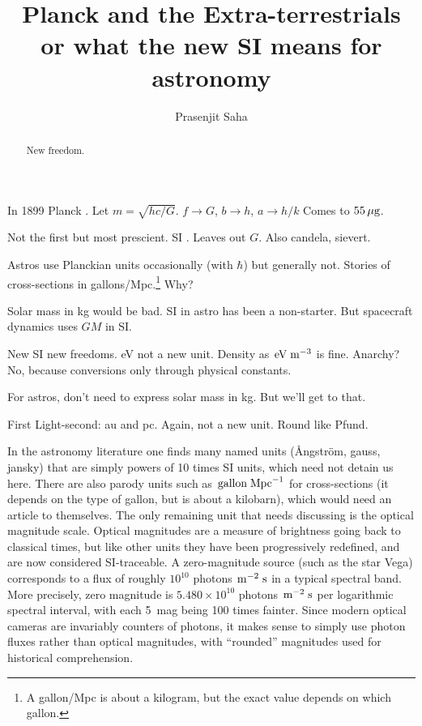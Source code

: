 \documentclass[aps,prb,12pt]{revtex4-1}
\def\unit#1{\;{\rm#1}}
\begin{document}
\title{Planck and the Extra-terrestrials\\
       or what the new SI means for astronomy}

\author{Prasenjit Saha} 

\begin{abstract}
New freedom.
\end{abstract}

\maketitle

In 1899 Planck \cite{Planck1899}.
Let $m=\sqrt{hc/G}$.
$f \rightarrow G$, $b\rightarrow h$, $a\rightarrow h/k$
Comes to $55\rm\,\mu g$.

Not the first \cite{Tomilin1999} but most prescient.  SI
\cite{Jeckelmann_2018}.  Leaves out $G$.  Also candela, sievert.

Astros use Planckian units occasionally (with $\hbar$) but generally
not.  Stories of cross-sections in gallons/Mpc.\footnote{A gallon/Mpc
  is about a kilogram, but the exact value depends on which gallon.}
Why?

Solar mass in kg would be bad.  SI in astro has been a non-starter.
But spacecraft dynamics uses $GM$ in SI.

New SI new freedoms.  eV not a new unit.  Density as
$\!\unit{eV}\unit{m}^{-3}$ is fine.  Anarchy?  No, because conversions
only through physical constants.

For astros, don't need to express solar mass in kg.  But we'll get to
that.

First Light-second: au and pc.  Again, not a new unit.  Round like Pfund.

In the astronomy literature one finds many named units (\AA ngström,
gauss, jansky) that are simply powers of 10 times SI units, which need
not detain us here.  There are also parody units such as
$\!\unit{gallon}\unit{Mpc}^{-1}$ for cross-sections (it depends on the
type of gallon, but is about a kilobarn), which would need an article
to themselves.  The only remaining unit that needs discussing is the
optical magnitude scale.  Optical magnitudes are a measure of
brightness going back to classical times, but like other units they
have been progressively redefined, and are now considered
SI-traceable.  A zero-magnitude source (such as the star Vega)
corresponds to a flux of roughly $10^{10}$ photons
$\!\unit{m}^{-2}\unit{s}$ in a typical spectral band.  More precisely,
zero magnitude is $5.480 \times10^{10}$ photons
$\!\unit{m}^{-2}\unit{s}$ per logarithmic spectral interval, with each
5~mag being 100 times fainter.  Since modern optical cameras are
invariably counters of photons, it makes sense to simply use photon
fluxes rather than optical magnitudes, with ``rounded'' magnitudes
used for historical comprehension.
\end{document}
